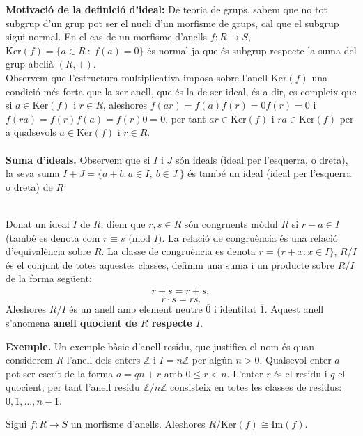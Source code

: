 \textbf{Motivació de la definició d'ideal:} De teoria de grups, sabem que no tot subgrup d'un grup pot ser el nucli d'un morfisme de grups, cal que el subgrup sigui normal.  En el cas de un morfisme d'anells $f:R\rightarrow S$, $\text{Ker}(f)=\{a\in R \ : \ f(a)=0\}$ és normal ja que és subgrup respecte la suma del grup abelià $(R,+)$. \\
Observem que l'estructura multiplicativa imposa sobre l'anell $\text{Ker}(f)$ una condició més forta que la ser anell, que és la de ser ideal, és a dir, es compleix que si $a\in \text{Ker}(f)$ i $r\in R$, aleshores $f(ar)=f(a)f(r)=0f(r)=0$ i $f(ra)=f(r)f(a)=f(r)0=0$, per tant $ar\in \text{Ker}(f)$ i $ra\in \text{Ker}(f)$ per a qualsevols $a\in \text{Ker}(f)$ i $r\in R$.
\\ \\
\hspace{.25cm} \textbf{Suma d'ideals.} Observem que si $I$ i $J$ són ideals (ideal per l'esquerra, o dreta), la seva suma $I+J=\{ a+b : a \in I, \ b\in J \  \}$ és també un ideal (ideal per l'esquerra o dreta) de $R$
\\
\\
\begin{definition} Donat un ideal $I$ de $R$, diem que $r,s\in R$ són congruents mòdul $R$ si $r-a\in I$ (també es denota com $r\equiv s \text{ (mod $I$)}$. La relació de congruència és una relació d'equivalència sobre $R$. La classe de congruència es denota $\overline{r}=\{ r+x : x\in I \}$, $R/I$ és el conjunt de totes aquestes classes, definim una suma i un producte sobre $R/I$ de la forma següent: $$\overline{r}+\overline{s}=\overline{r+s},$$ $$\overline{r}\cdot \overline{s}=\overline{rs}.$$ Aleshores $R/I$ és un anell amb element neutre $\overline{0}$ i identitat $\overline{1}$. Aquest anell s'anomena \textbf{anell quocient de $R$ respecte $I$}.
\end{definition}

\noindent \textbf{Exemple.} Un exemple bàsic d'anell residu, que justifica el nom és quan considerem $R$ l'anell dels enters $\mathbb{Z}$ i $I=n\mathbb{Z}$ per algún $n>0$. Qualsevol enter $a$ pot ser escrit de la forma $a=qn+r$ amb $0\leq r <n$. L'enter $r$ és el residu i $q$ el quocient, per tant l'anell residu $\mathbb{Z}/n\mathbb{Z}$ consisteix en totes les classes de residus: $\overline{0},\overline{1},\dots, \overline{n-1}$.

\begin{theorem}
Sigui $f: R \rightarrow S$ un morfisme d'anells. Aleshores $R/\text{Ker}(f) \cong \text{Im}(f)$.
\end{theorem}

